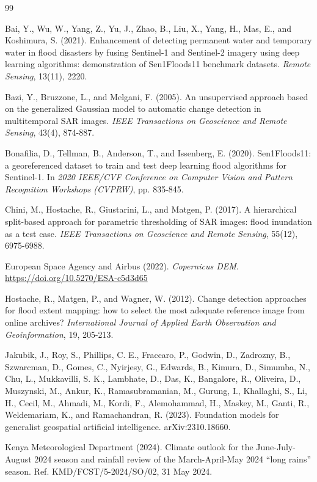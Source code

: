 \documentclass[11pt]{article}
\begin{document}
\begin{thebibliography}{99}

Bai, Y., Wu, W., Yang, Z., Yu, J., Zhao, B., Liu, X., Yang, H., Mas, E., and
Koshimura, S. (2021). Enhancement of detecting permanent water and temporary
water in flood disasters by fusing Sentinel-1 and Sentinel-2 imagery using
deep learning algorithms: demonstration of Sen1Floods11 benchmark datasets.
\textit{Remote Sensing}, 13(11), 2220.

Bazi, Y., Bruzzone, L., and Melgani, F. (2005). An unsupervised approach based
on the generalized Gaussian model to automatic change detection in
multitemporal SAR images. \textit{IEEE Transactions on Geoscience and Remote
Sensing}, 43(4), 874-887.

Bonafilia, D., Tellman, B., Anderson, T., and Issenberg, E. (2020).
Sen1Floods11: a georeferenced dataset to train and test deep learning flood
algorithms for Sentinel-1. In \textit{2020 IEEE/CVF Conference on Computer
Vision and Pattern Recognition Workshops (CVPRW)}, pp. 835-845.

Chini, M., Hostache, R., Giustarini, L., and Matgen, P. (2017). A hierarchical
split-based approach for parametric thresholding of SAR images: flood
inundation as a test case. \textit{IEEE Transactions on Geoscience and Remote
Sensing}, 55(12), 6975-6988.

European Space Agency and Airbus (2022). \textit{Copernicus DEM}.
\url{https://doi.org/10.5270/ESA-c5d3d65}

Hostache, R., Matgen, P., and Wagner, W. (2012). Change detection approaches
for flood extent mapping: how to select the most adequate reference image from
online archives? \textit{International Journal of Applied Earth Observation
and Geoinformation}, 19, 205-213.

Jakubik, J., Roy, S., Phillips, C. E., Fraccaro, P., Godwin, D., Zadrozny, B.,
Szwarcman, D., Gomes, C., Nyirjesy, G., Edwards, B., Kimura, D., Simumba, N.,
Chu, L., Mukkavilli, S. K., Lambhate, D., Das, K., Bangalore, R., Oliveira,
D., Muszynski, M., Ankur, K., Ramasubramanian, M., Gurung, I., Khallaghi, S.,
Li, H., Cecil, M., Ahmadi, M., Kordi, F., Alemohammad, H., Maskey, M., Ganti,
R., Weldemariam, K., and Ramachandran, R. (2023). Foundation models for
generalist geospatial artificial intelligence. arXiv:2310.18660.

Kenya Meteorological Department (2024). Climate outlook for the June-July-August
2024 season and rainfall review of the March-April-May 2024 ``long rains''
season. Ref. KMD/FCST/5-2024/SO/02, 31 May 2024.


\end{thebibliography}
\end{document}
